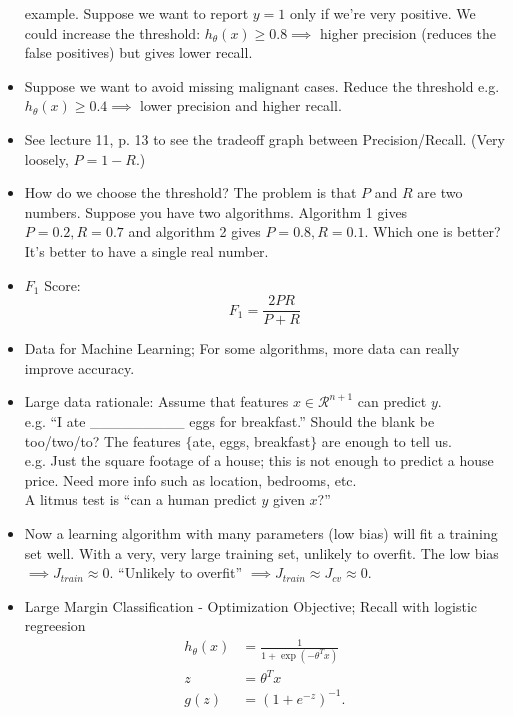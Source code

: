 \documentclass[10pt]{article}
\begin{document}
\begin{itemize}
    example. Suppose we want to report $y=1$ only if we're very
    positive. We could increase the threshold: $h_{\theta}(x) \geq 0.8
    \implies$ higher precision (reduces the false positives) but gives
    lower recall.
  \item Suppose we want to avoid missing malignant cases. Reduce the threshold e.g. $h_{\theta}(x) \geq 0.4 \implies$ lower precision and higher recall.
  \item See lecture 11, p. 13 to see the tradeoff graph between Precision/Recall. (Very loosely, $P = 1-R$.)
  \item How do we choose the threshold? The problem is that $P$ and
    $R$ are two numbers. Suppose you have two algorithms. Algorithm 1
    gives $P=0.2,R=0.7$ and algorithm 2 gives $P=0.8, R=0.1$. Which
    one is better? It's better to have a single real number.
  \item $F_1$ Score:
    \begin{equation*}
      F_1 = \frac{2PR}{P+R}
    \end{equation*}
  \item Data for Machine Learning; For some algorithms, more data can really improve accuracy.
  \item Large data rationale: Assume that features $x \in \mathcal{R}^{n+1}$ can predict $y$. \\
    e.g. ``I ate \_\_\_\_\_\_\_\_\_ eggs for breakfast.'' Should the blank be too/two/to? The features $\{$ate, eggs, breakfast$\}$ are enough to tell us. \\
    e.g. Just the square footage of a house; this is not enough to predict a house price. Need more info such as location, bedrooms, etc. \\
    A litmus test is ``can a human predict $y$ given $x$?''
  \item Now a learning algorithm with many parameters (low bias) will
    fit a training set well. With a very, very large training set,
    unlikely to overfit. The low bias $\implies J_{train} \approx
    0$. ``Unlikely to overfit'' $\implies J_{train} \approx J_{cv}
    \approx 0$.
  \item Large Margin Classification - Optimization Objective; Recall with logistic regreesion
    \begin{align*}
      h_{\theta}(x) &= \frac{1}{1 + \exp \left( - \theta^T x\right)} \\
      z &= \theta^T x \\
      g(z) &= \left(1 + e^{-z}\right)^{-1}.
    \end{align*}

\end{itemize}
\end{document}
